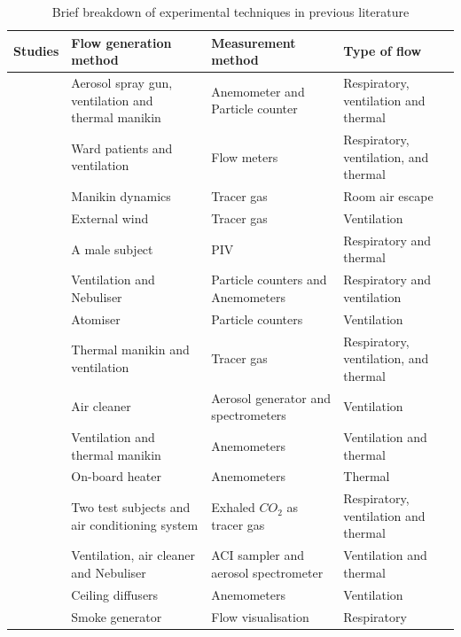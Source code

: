 \documentclass[a4paper,12pt]{elsarticle}
\begin{document}
\begin{longtable}{|m{3.55cm}|m{3.5cm}|m{3.5cm}|m{3.5cm}|}
\caption{Brief breakdown of experimental techniques in previous literature}
\label{tab:exp}\\
    \hline
    \textbf{Studies} & \textbf{Flow generation method} & \textbf{Measurement method} & \textbf{Type of flow}\\
    \hline
    \citet{berrouk2010experimental}& Aerosol spray gun, ventilation and thermal manikin & Anemometer and Particle counter & Respiratory, ventilation and thermal\\
    \hline
    \citet{li2005role} & Ward patients and ventilation & Flow meters & Respiratory, ventilation, and thermal\\
    \hline
    \citet{saarinen2015large} & Manikin dynamics & Tracer gas & Room air escape \\
    \hline
    \citet{jiang2009investigating}& External wind & Tracer gas & Ventilation\\
    \hline
    \citet{faleiros2022tu}& A male subject & PIV & Respiratory and thermal\\
    \hline
    \citet{romano2015numerical}& Ventilation and Nebuliser & Particle counters and Anemometers & Respiratory and ventilation\\
    \hline
    \citet{quintero2022reducing}& Atomiser & Particle counters & Ventilation \\
    \hline
    \citet{hang2015potential}& Thermal manikin and ventilation & Tracer gas & Respiratory, ventilation, and thermal \\
    \hline
    \citet{jain2023numerical}& Air cleaner & Aerosol generator and spectrometers & Ventilation \\
    \hline
    \citet{li2023numerical}& Ventilation and thermal manikin & Anemometers  & Ventilation and thermal \\
    \hline
    \citet{ho2021modeling}& On-board heater & Anemometers & Thermal\\
    \hline
    \citet{deng2021control}& Two test subjects and air conditioning system & Exhaled $CO_2$ as tracer gas & Respiratory, ventilation and thermal\\
    \hline
    \citet{oksanen2022combining}& Ventilation, air cleaner and Nebuliser & ACI sampler and aerosol spectrometer & Ventilation and thermal\\
    \hline
    \citet{arpino2023cfd}& Ceiling diffusers & Anemometers & Ventilation \\
    \hline
    \citet{giri2022colliding}& Smoke generator & Flow visualisation & Respiratory\\

\end{longtable}
\end{document}
